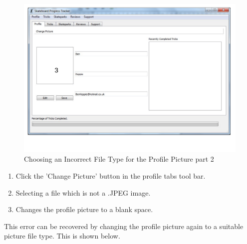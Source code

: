 \begin{figure}[H]
    \includegraphics[width=\textwidth]{./Manual/Images/PictureValidation2.pdf}
    \caption{Choosing an Incorrect File Type for the Profile Picture part 2} \label{fig:PictureError2}
\end{figure}

\begin{enumerate} 
\item Click the 'Change Picture' button in the profile tabs tool bar.
\item Selecting a file which is not a .JPEG image.
\item Changes the profile picture to a blank space.
\end{enumerate}

 This error can be recovered by changing the profile picture again to a suitable picture file type. This is shown below.

